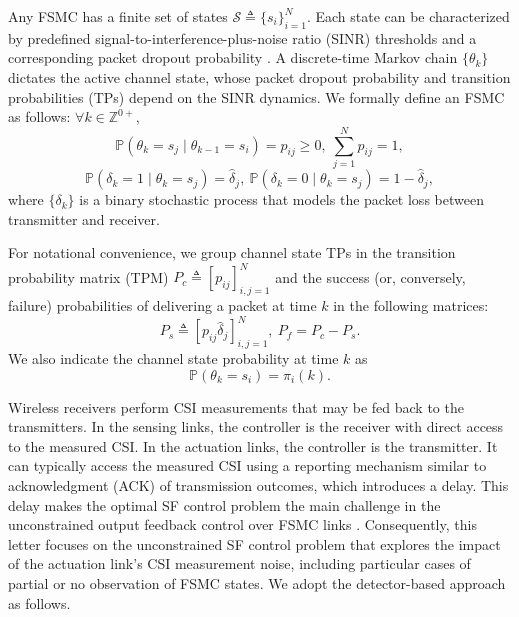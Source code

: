 \documentclass[journal,twoside,web]{ieeecolor}
\begin{document}
Any FSMC has a finite set of states $\mathcal{S}\triangleq\{s_i\}_{i=1}^{N}$. Each state can be characterized by predefined signal-to-interference-plus-noise ratio (SINR) thresholds and a corresponding packet dropout probability \cite{zacchialun2024access}. A discrete-time Markov chain $\{\theta_k\}$ dictates the active channel state, whose packet dropout probability and transition probabilities (TPs) depend on the SINR dynamics. We formally define an FSMC as follows: $\forall k\in \mathbb{Z}^{0+}$,
\begin{equation}\label{eq:p-ij}
    \mathbb{P}(\theta_{k} = s_j \mid \theta_{k-1} = s_i) = p_{ij} \geq 0,~ \sum_{j=1}^N p_{ij} = 1,
\end{equation}
\begin{equation}\label{eq:p-delta}
    \mathbb{P}(\delta_k = 1 \mid \theta_{k} = s_j) = \hat{\delta}_{j},~
    \mathbb{P}(\delta_k = 0 \mid \theta_{k} = s_j) = 1 - \hat{\delta}_{j},
\end{equation}
where $\{\delta_k\}$ is a binary stochastic process that models the packet loss between transmitter and receiver.

For notational convenience, we group
channel state TPs in the transition probability matrix (TPM) $P_{c}^{} \triangleq \left[p_{ij}\right]_{i,j=1}^{N}$
and the  success (or, conversely, failure) probabilities of delivering a packet at time $k$ in the following matrices:
\begin{equation}\label{eq:Ps}
    P_{s}^{} \triangleq \left[p_{ij}\hat{\delta}_{j}\right]_{i,j=1}^{N},~P_{f} = P_{c} - P_{s}.
\end{equation}
We also indicate the channel state probability at time $k$ as
\begin{equation}\label{eq:pik}
     \mathbb{P}(\theta_{k} = s_i) = \pi_{i}(k).
\end{equation}

Wireless receivers perform CSI measurements that may be fed back to the transmitters. In the sensing links, the controller is the receiver with direct access to the measured CSI. In the actuation links, the controller is the transmitter. It can typically access the measured CSI using a reporting mechanism similar to acknowledgment (ACK) of transmission outcomes, which introduces a delay. This delay makes the optimal SF control problem the main challenge in the unconstrained output feedback control over FSMC links \cite{impicciatore2024tac}. Consequently, this letter focuses on the unconstrained SF control problem that explores the impact of the actuation link's CSI measurement noise, including particular cases of partial or no observation of FSMC states. We adopt the detector-based approach as follows.
\end{document}
